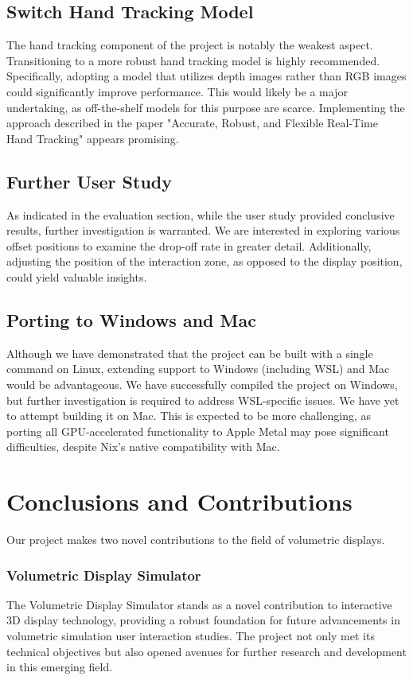 \subsection{Switch Hand Tracking Model}
The hand tracking component of the project is notably the weakest aspect. Transitioning to a more robust hand tracking model is highly recommended. Specifically, adopting a model that utilizes depth images rather than RGB images could significantly improve performance. This would likely be a major undertaking, as off-the-shelf models for this purpose are scarce. Implementing the approach described in the paper "Accurate, Robust, and Flexible Real-Time Hand Tracking" \cite{sharp2015accurate} appears promising.

\subsection{Further User Study}
As indicated in the evaluation section, while the user study provided conclusive results, further investigation is warranted. We are interested in exploring various offset positions to examine the drop-off rate in greater detail. Additionally, adjusting the position of the interaction zone, as opposed to the display position, could yield valuable insights.

\subsection{Porting to Windows and Mac}
Although we have demonstrated that the project can be built with a single command on Linux, extending support to Windows (including WSL) and Mac would be advantageous. We have successfully compiled the project on Windows, but further investigation is required to address WSL-specific issues. We have yet to attempt building it on Mac. This is expected to be more challenging, as porting all GPU-accelerated functionality to Apple Metal \cite{noauthor_httpsdeveloperapplecommetalmetal-shading-language-specificationpdf_nodate} may pose significant difficulties, despite Nix's native compatibility with Mac.

\section{Conclusions and Contributions}

Our project makes two novel contributions to the field of volumetric displays.

\subsubsection{Volumetric Display Simulator}
The Volumetric Display Simulator stands as a novel contribution to interactive 3D display technology, providing a robust foundation for future advancements in volumetric simulation user interaction studies. The project not only met its technical objectives but also opened avenues for further research and development in this emerging field.

